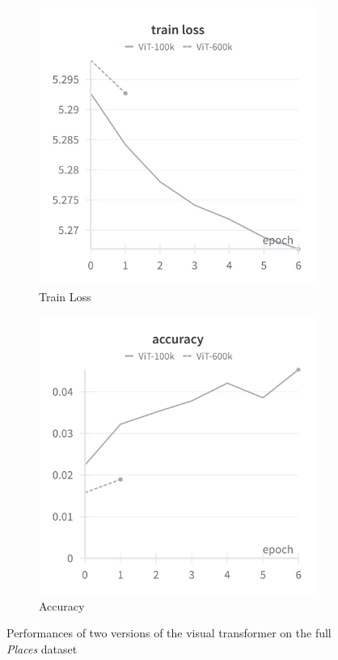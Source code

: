 \documentclass[twocolumn,superscriptaddress,aps]{revtex4-1}
\begin{document}
\begin{figure}[H]
\begin{subfigure}{0.235 \textwidth}
        \includegraphics[width = 0.99 \textwidth]{images/205classes_vit_train.png}
        \caption{Train Loss}
    \end{subfigure}
    \begin{subfigure}{0.35 \textwidth}
        \includegraphics[width = 0.99 \textwidth]{images/205classes_vit_accuracy.png}
        \caption{Accuracy}
    \end{subfigure}
    
    \caption{Performances of two versions of the visual transformer on the full \textit{Places} dataset}
    \label{fig:205_vit}
\end{figure}
\end{document}

